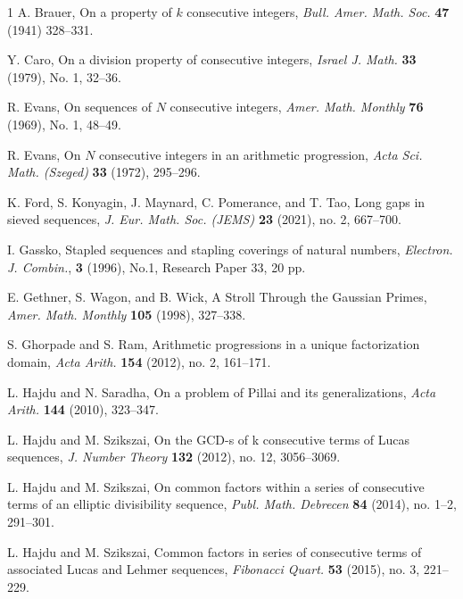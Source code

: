 \documentclass[11pt]{article}
\begin{document}
\begin{thebibliography}{1}
 A.  Brauer, On  a  property  of
$k$ consecutive  integers,
{\em Bull.  Amer.  Math.  Soc.}
\textbf{47}  (1941) 328--331.

 Y. Caro, On a division property of consecutive integers, {\em Israel J. Math.}  {\textbf{33}} (1979), No. 1, 32--36.


 R. Evans, On sequences of $N$ consecutive integers, {\em Amer. Math. Monthly} {\textbf{76}} (1969), No. 1, 48--49.

 R. Evans, On $N$ consecutive integers in an arithmetic progression, {\em Acta Sci. Math. (Szeged)} {\textbf{33}} (1972),
295--296.

 K. Ford, S. Konyagin, J. Maynard, C. Pomerance, and T. Tao, Long gaps in sieved sequences, {\em J. Eur. Math. Soc. (JEMS)} \textbf{23} (2021), no. 2, 667--700.

 I. Gassko, Stapled sequences and stapling coverings of natural numbers, {\em Electron. J. Combin.},
{\textbf{3}} (1996), No.1, Research Paper 33, 20 pp.

 E. Gethner, S. Wagon, and B. Wick, A Stroll Through the Gaussian Primes, {\em Amer. Math. Monthly} \textbf{105} (1998), 327--338.

  S. Ghorpade and S. Ram, Arithmetic progressions in a unique factorization domain, {\em Acta Arith.} {\textbf{154}} (2012), no. 2, 161--171.

 L. Hajdu and N. Saradha, On a problem of Pillai and its generalizations, {\em Acta Arith.} {\textbf{144}} (2010), 323--347.

 L. Hajdu and M. Szikszai, On the GCD-s of k consecutive terms of Lucas sequences, {\em J. Number Theory} {\textbf{132}} (2012), no. 12, 3056--3069.

 L. Hajdu and M. Szikszai, On common factors within a series of consecutive terms of an elliptic divisibility sequence,  {\em Publ. Math. Debrecen} {\textbf{84}} (2014), no. 1--2, 291--301.

 L. Hajdu and M. Szikszai, Common factors in series of consecutive terms of associated Lucas and Lehmer sequences,  {\em Fibonacci Quart.} {\textbf{53}} (2015), no. 3, 221--229.


\end{thebibliography}
\end{document}
